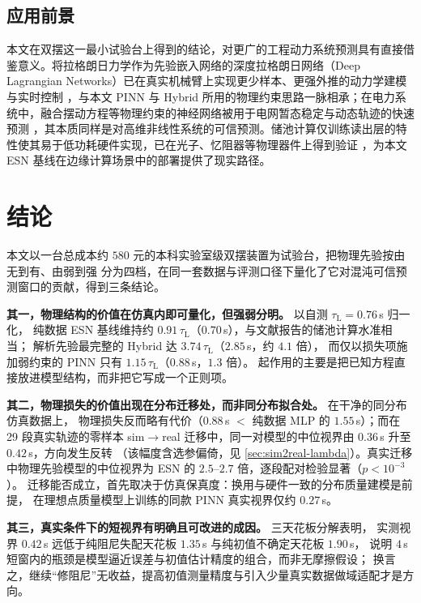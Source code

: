 \documentclass[a4paper,12pt]{ctexart}   %
\let\cite\supercite   %
\newcommand{\tauL}{\tau_{\mathrm{L}}}              %
\renewcommand{\emph}[1]{#1}
\begin{document}
\subsection{应用前景}
本文在双摆这一最小试验台上得到的结论，对更广的工程动力系统预测具有直接借鉴意义。将拉格朗日力学作为先验嵌入网络的深度拉格朗日网络（Deep Lagrangian Networks）已在真实机械臂上实现更少样本、更强外推的动力学建模与实时控制 \cite{lutter2019delan}，与本文 PINN 与 Hybrid 所用的物理约束思路一脉相承；在电力系统中，融合摆动方程等物理约束的神经网络被用于电网暂态稳定与动态轨迹的快速预测 \cite{huang2023pinnpower}，其本质同样是对高维非线性系统的可信预测。储池计算仅训练读出层的特性使其易于低功耗硬件实现，已在光子、忆阻器等物理器件上得到验证 \cite{tanaka2019physical}，为本文 ESN 基线在边缘计算场景中的部署提供了现实路径。

\section{结论}
\label{sec:conclusion}

本文以一台总成本约 $580$ 元的本科实验室级双摆装置为试验台，把物理先验按由无到有、由弱到强
分为四档，在同一套数据与评测口径下量化了它对混沌可信预测窗口的贡献，得到三条结论。

\textbf{其一，物理结构的价值在仿真内即可量化，但强弱分明。} 以自测 $\tauL = 0.76$\,s 归一化，
纯数据 ESN 基线维持约 $0.91\,\tauL$（$0.70$\,s），与文献报告的储池计算水准相当；
解析先验最完整的 Hybrid 达 $3.74\,\tauL$（$2.85$\,s，约 $4.1$ 倍），
而仅以损失项施加弱约束的 PINN 只有 $1.15\,\tauL$（$0.88$\,s，$1.3$ 倍）。
起作用的主要是\emph{把已知方程直接放进模型结构}，而非把它写成一个正则项。

\textbf{其二，物理损失的价值出现在分布迁移处，而非同分布拟合处。} 在干净的同分布仿真数据上，
物理损失反而略有代价（$0.88$\,s $<$ 纯数据 MLP 的 $1.55$\,s）；而在 29 段真实轨迹的零样本
sim$\to$real 迁移中，同一对模型的中位视界由 $0.36$\,s 升至 $0.42$\,s，方向发生反转
（该幅度含选参偏倚，见 \cref{sec:sim2real-lambda}）。真实迁移中物理先验模型的中位视界为
ESN 的 $2.5\text{--}2.7$ 倍，逐段配对检验显著（$p < 10^{-3}$）。
迁移能否成立，首先取决于仿真保真度：换用与硬件一致的分布质量建模是前提，
在理想点质量模型上训练的同款 PINN 真实视界仅约 $0.27$\,s。

\textbf{其三，真实条件下的短视界有明确且可改进的成因。} 三天花板分解表明，
实测视界 $0.42$\,s 远低于纯阻尼失配天花板 $1.35$\,s 与纯初值不确定天花板 $1.90$\,s，
说明 $4$\,s 短窗内的瓶颈是模型逼近误差与初值估计精度的组合，而非无摩擦假设；
换言之，继续“修阻尼”无收益，提高初值测量精度与引入少量真实数据做域适配才是方向。
\end{document}
